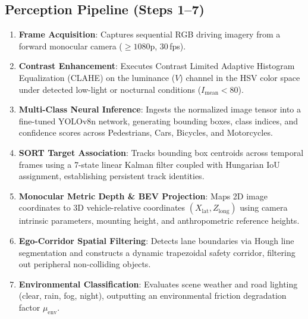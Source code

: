 \documentclass[3p,twocolumn]{elsarticle}
\begin{document}
\subsection{Perception Pipeline (Steps 1--7)}
\begin{enumerate}
  \item \textbf{Frame Acquisition}: Captures sequential RGB driving imagery from a forward monocular camera ($\ge 1080\text{p}$, 30\,fps).
  \item \textbf{Contrast Enhancement}: Executes Contrast Limited Adaptive Histogram Equalization (CLAHE) on the luminance ($V$) channel in the HSV color space under detected low-light or nocturnal conditions ($I_{\text{mean}} < 80$).
  \item \textbf{Multi-Class Neural Inference}: Ingests the normalized image tensor into a fine-tuned YOLOv8n network, generating bounding boxes, class indices, and confidence scores across Pedestrians, Cars, Bicycles, and Motorcycles.
  \item \textbf{SORT Target Association}: Tracks bounding box centroids across temporal frames using a 7-state linear Kalman filter coupled with Hungarian IoU assignment, establishing persistent track identities.
  \item \textbf{Monocular Metric Depth \& BEV Projection}: Maps 2D image coordinates to 3D vehicle-relative coordinates $(X_{\text{lat}}, Z_{\text{long}})$ using camera intrinsic parameters, mounting height, and anthropometric reference heights.
  \item \textbf{Ego-Corridor Spatial Filtering}: Detects lane boundaries via Hough line segmentation and constructs a dynamic trapezoidal safety corridor, filtering out peripheral non-colliding objects.
  \item \textbf{Environmental Classification}: Evaluates scene weather and road lighting (clear, rain, fog, night), outputting an environmental friction degradation factor $\mu_{\text{env}}$.
\end{enumerate}
\end{document}
